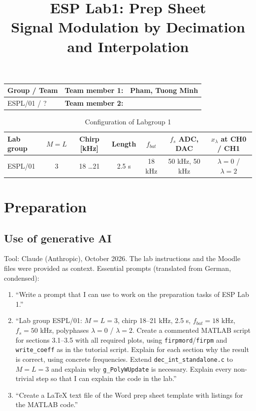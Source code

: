 \documentclass[a4paper,11pt]{article}
\title{ESP Lab1: Prep Sheet\\ \large Signal Modulation by Decimation and Interpolation}
\author{}
\date{}
\begin{document}
	\sloppy
	\maketitle
	
	\begin{table}[h]
		\centering
		\begin{tabular}{|l|l|l|}
			\hline
			\textbf{Group / Team} & \textbf{Team member 1:} & Pham, Tuong Minh \\
			\hline
			ESPL/01 / ? & \textbf{Team member 2:} & \\
			\hline
		\end{tabular}
	\end{table}
	
	
	
	\begin{table}[h]
		\centering
		\caption{Configuration of Labgroup 1}
		\small
		\begin{tabular}{|l|c|c|c|c|c|c|}
			\hline
			\textbf{Lab group} & \textbf{$M = L$} & \textbf{Chirp [kHz]} & \textbf{Length} & \textbf{$f_{bat}$} & \textbf{$f_s$ ADC, DAC} & \textbf{$x_\lambda$ at CH0 / CH1} \\
			\hline
			ESPL/01 & 3 & 18 \dots 21 & 2.5 s & 18 kHz & 50 kHz, 50 kHz & $\lambda=0$ / $\lambda=2$ \\
			\hline
		\end{tabular}
	\end{table}
	
	\setcounter{section}{2}
	\section{Preparation}
	
	\subsection*{Use of generative AI}
	
	Tool: Claude (Anthropic), October 2026. The lab instructions and the Moodle files were provided as context. Essential prompts (translated from German, condensed):
	\begin{enumerate}
		\item ``Write a prompt that I can use to work on the preparation tasks of ESP Lab 1.''
		\item ``Lab group ESPL/01: $M = L = 3$, chirp 18--21 kHz, 2.5 s, $f_{bat} = 18$ kHz,
		$f_s = 50$ kHz, polyphases $\lambda = 0$ / $\lambda = 2$. Create a commented MATLAB
		script for sections 3.1--3.5 with all required plots, using \texttt{firpmord}/\texttt{firpm}
		and \texttt{write\_coeff} as in the tutorial script. Explain for each section why the
		result is correct, using concrete frequencies. Extend \texttt{dec\_int\_standalone.c}
		to $M = L = 3$ and explain why \texttt{g\_PolyWUpdate} is necessary. Explain every
		non-trivial step so that I can explain the code in the lab.''
		\item ``Create a LaTeX text file of the Word prep sheet template with listings for the MATLAB code.''
	\end{enumerate}
	
\end{document}
